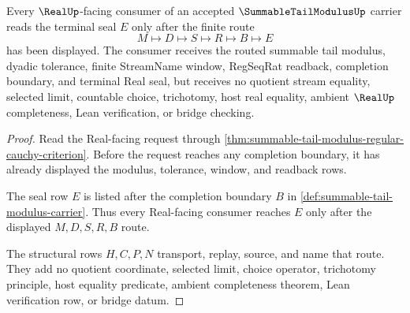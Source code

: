 \begin{theorem}
\label{thm:summable-tail-modulus-real-seal-handoff}
Every $\RealUp$-facing consumer of an accepted $\SummableTailModulusUp$ carrier reads the terminal seal $E$ only after the finite route
$$
M \longmapsto D \longmapsto S \longmapsto R \longmapsto B \longmapsto E
$$
has been displayed. The consumer receives the routed summable tail modulus, dyadic tolerance, finite StreamName window, RegSeqRat readback, completion boundary, and terminal Real seal, but receives no quotient stream equality, selected limit, countable choice, trichotomy, host real equality, ambient $\RealUp$ completeness, Lean verification, or bridge checking.
\end{theorem}
\begin{proof}
Read the Real-facing request through \autoref{thm:summable-tail-modulus-regular-cauchy-criterion}. Before the request reaches any completion boundary, it has already displayed the modulus, tolerance, window, and readback rows.

The seal row $E$ is listed after the completion boundary $B$ in \autoref{def:summable-tail-modulus-carrier}. Thus every Real-facing consumer reaches $E$ only after the displayed $M,D,S,R,B$ route.

The structural rows $H,C,P,N$ transport, replay, source, and name that route. They add no quotient coordinate, selected limit, choice operator, trichotomy principle, host equality predicate, ambient completeness theorem, Lean verification row, or bridge datum.
\end{proof}




